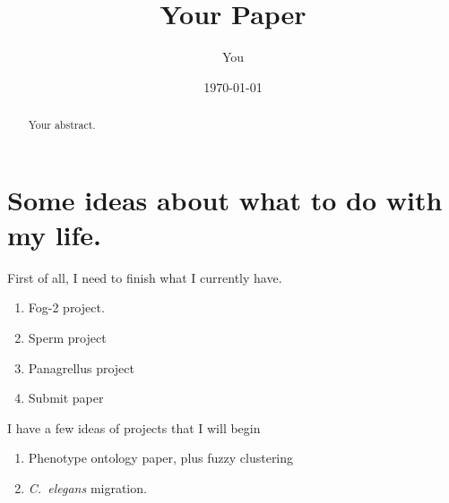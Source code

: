 \documentclass[a4paper]{article}
\title{Your Paper}
\author{You}
\date{\today}
\begin{document}
\maketitle

\begin{abstract}
Your abstract.
\end{abstract}

\section{Some ideas about what to do with my life.}

First of all, I need to finish what I currently have. 
\begin{enumerate}
	\item Fog-2 project.
	\item Sperm project
	\item Panagrellus project
	\item Submit paper
\end{enumerate}

I have a few ideas of projects that I will begin
\begin{enumerate}
	\item Phenotype ontology paper, plus fuzzy clustering
	\item \emph{C.~elegans} migration.
\end{enumerate}
\end{document}
